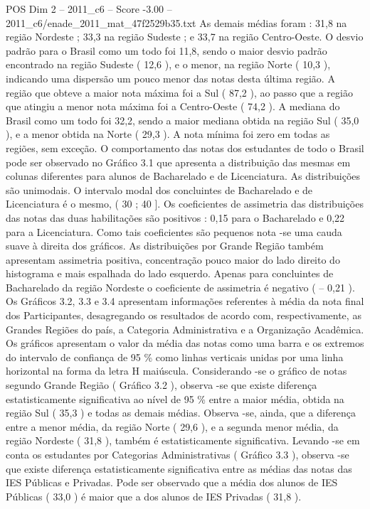 \begin{textsample}{POS Dim 2 – 2011\_c6 – Score -3.00 – 2011\_c6/enade\_2011\_mat\_47f2529b35.txt}
As demais médias foram : 31,8 na região Nordeste ; 33,3 na região Sudeste ; e 33,7 na região Centro-Oeste.
O desvio padrão para o Brasil como um todo foi 11,8, sendo o maior desvio padrão encontrado na região Sudeste ( 12,6 ), e o menor, na região Norte ( 10,3 ), indicando uma dispersão um pouco menor das notas desta última região.
A região que obteve a maior nota máxima foi a Sul ( 87,2 ), ao passo que a região que atingiu a menor nota máxima foi a Centro-Oeste ( 74,2 ).
A mediana do Brasil como um todo foi 32,2, sendo a maior mediana obtida na região Sul ( 35,0 ), e a menor obtida na Norte ( 29,3 ).
A nota mínima foi zero em todas as regiões, sem exceção.
O comportamento das notas dos estudantes de todo o Brasil pode ser observado no Gráfico 3.1 que apresenta a distribuição das mesmas em colunas diferentes para alunos de Bacharelado e de Licenciatura.
As distribuições são unimodais.
O intervalo modal dos concluintes de Bacharelado e de Licenciatura é o mesmo, ( 30 ; 40 ].
Os coeficientes de assimetria das distribuições das notas das duas habilitações são positivos : 0,15 para o Bacharelado e 0,22 para a Licenciatura.
Como tais coeficientes são pequenos nota -se uma cauda suave à direita dos gráficos.
As distribuições por Grande Região também apresentam assimetria positiva, concentração pouco maior do lado direito do histograma e mais espalhada do lado esquerdo.
Apenas para concluintes de Bacharelado da região Nordeste o coeficiente de assimetria é negativo ( – 0,21 ).
Os Gráficos 3.2, 3.3 e 3.4 apresentam informações referentes à média da nota final dos Participantes, desagregando os resultados de acordo com, respectivamente, as Grandes Regiões do país, a Categoria Administrativa e a Organização Acadêmica.
Os gráficos apresentam o valor da média das notas como uma barra e os extremos do intervalo de confiança de 95 \% como linhas verticais unidas por uma linha horizontal na forma da letra H maiúscula.
Considerando -se o gráfico de notas segundo Grande Região ( Gráfico 3.2 ), observa -se que existe diferença estatisticamente significativa ao nível de 95 \% entre a maior média, obtida na região Sul ( 35,3 ) e todas as demais médias.
Observa -se, ainda, que a diferença entre a menor média, da região Norte ( 29,6 ), e a segunda menor média, da região Nordeste ( 31,8 ), também é estatisticamente significativa.
Levando -se em conta os estudantes por Categorias Administrativas ( Gráfico 3.3 ), observa -se que existe diferença estatisticamente significativa entre as médias das notas das IES Públicas e Privadas.
Pode ser observado que a média dos alunos de IES Públicas ( 33,0 ) é maior que a dos alunos de IES Privadas ( 31,8 ).

\end{textsample}
